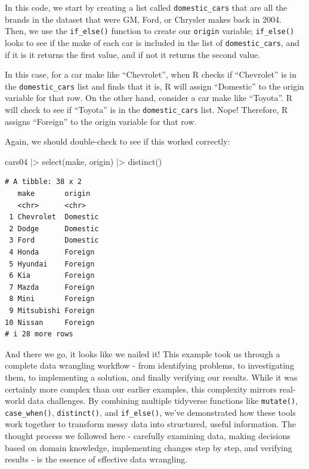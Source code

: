 \documentclass[
  letterpaper,
]{book}
\newenvironment{Shaded}{\begin{snugshade}}{\end{snugshade}}
\newcommand{\FunctionTok}[1]{\textcolor[rgb]{0.28,0.35,0.67}{#1}}
\newcommand{\NormalTok}[1]{\textcolor[rgb]{0.00,0.23,0.31}{#1}}
\newcommand{\SpecialCharTok}[1]{\textcolor[rgb]{0.37,0.37,0.37}{#1}}
\begin{document}
In this code, we start by creating a list called \texttt{domestic\_cars}
that are all the brands in the dataset that were GM, Ford, or Chrysler
makes back in 2004. Then, we use the \texttt{if\_else()} function to
create our \texttt{origin} variable; \texttt{if\_else()} looks to see if
the make of each car is included in the list of \texttt{domestic\_cars},
and if it is it returns the first value, and if not it returns the
second value.

In this case, for a car make like ``Chevrolet'', when R checks if
``Chevrolet'' is in the \texttt{domestic\_cars} list and finds that it
is, R will assign ``Domestic'' to the origin variable for that row. On
the other hand, consider a car make like ``Toyota''. R will check to see
if ``Toyota'' is in the \texttt{domestic\_cars} list. Nope! Therefore, R
assigns ``Foreign'' to the origin variable for that row.

Again, we should double-check to see if this worked correctly:

\begin{Shaded}
\begin{Highlighting}[]
\NormalTok{cars04 }\SpecialCharTok{|\textgreater{}} 
  \FunctionTok{select}\NormalTok{(make, origin) }\SpecialCharTok{|\textgreater{}} 
  \FunctionTok{distinct}\NormalTok{()}
\end{Highlighting}
\end{Shaded}

\begin{verbatim}
# A tibble: 38 x 2
   make       origin  
   <chr>      <chr>   
 1 Chevrolet  Domestic
 2 Dodge      Domestic
 3 Ford       Domestic
 4 Honda      Foreign 
 5 Hyundai    Foreign 
 6 Kia        Foreign 
 7 Mazda      Foreign 
 8 Mini       Foreign 
 9 Mitsubishi Foreign 
10 Nissan     Foreign 
# i 28 more rows
\end{verbatim}

And there we go, it looks like we nailed it! This example took us
through a complete data wrangling workflow - from identifying problems,
to investigating them, to implementing a solution, and finally verifying
our results. While it was certainly more complex than our earlier
examples, this complexity mirrors real-world data challenges. By
combining multiple tidyverse functions like \texttt{mutate()},
\texttt{case\_when()}, \texttt{distinct()}, and \texttt{if\_else()},
we've demonstrated how these tools work together to transform messy data
into structured, useful information. The thought process we followed
here - carefully examining data, making decisions based on domain
knowledge, implementing changes step by step, and verifying results - is
the essence of effective data wrangling.
\end{document}

